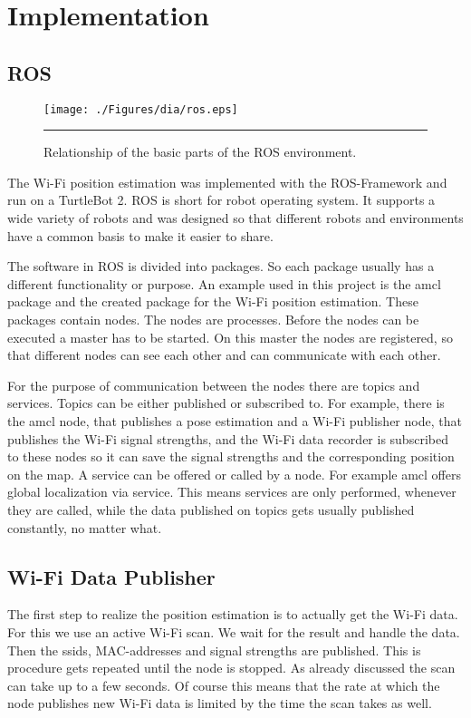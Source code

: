 \chapter{Implementation} %
\label{Chapter3}
\section{ROS}
\begin{figure}[htbp]
	\centering
		\texttt{[image: ./Figures/dia/ros.eps]}
		\rule{35em}{0.5pt}
	\caption[Diagram of basic concepts in ROS]{Relationship of the basic parts of the ROS environment.}
	\label{fig:ros_architecture}
\end{figure}
The Wi-Fi position estimation was implemented with the ROS-Framework and run on a TurtleBot 2. ROS is short for robot operating system. It supports a wide variety of robots and was designed so that different robots and environments have a common basis to make it easier to share. 

The software in ROS is divided into packages. So each package usually has a different functionality or purpose. An example used in this project is the amcl package and the created package for the Wi-Fi position estimation. These packages contain nodes. The nodes are processes. Before the nodes can be executed a master has to be started. On this master the nodes are registered, so that different nodes can see each other and can communicate with each other. 

For the purpose of communication between the nodes there are topics and services. Topics can be either published or subscribed to. For example, there is the amcl node, that publishes a pose estimation and a Wi-Fi publisher node, that publishes the Wi-Fi signal strengths, and the Wi-Fi data recorder is subscribed to these nodes so it can save the signal strengths and the corresponding position on the map. A service can be offered or called by a node. For example amcl offers global localization via service. This means services are only performed, whenever they are called, while the data published on topics gets usually published constantly, no matter what.

\section{Wi-Fi Data Publisher}
The first step to realize the position estimation is to actually get the Wi-Fi data. For this we use an active Wi-Fi scan. We wait for the result and handle the data. Then the ssids, MAC-addresses and signal strengths are published. This is procedure gets repeated until the node is stopped. As already discussed the scan can take up to a few seconds. Of course this means that the rate at which the node publishes new Wi-Fi data is limited by the time the scan takes as well.
